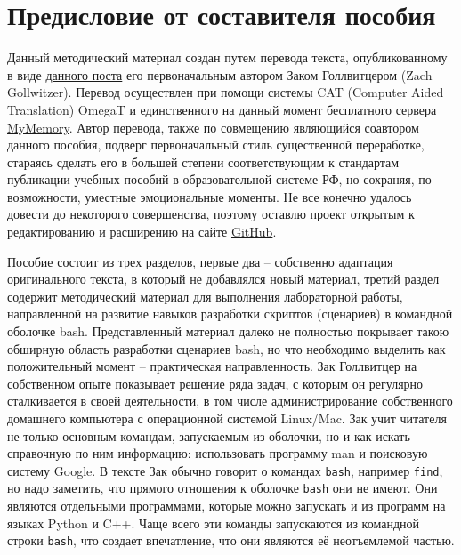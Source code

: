 \documentclass[a4paper,12pt,final,openany]{extbook}
\begin{document}
\mainmatter
\setcounter{tocdepth}{1}
\renewcommand{\contentsname}{Содержание}
\tableofcontents

\clearpage

\chapter*{Предисловие от составителя пособия}

Данный методический материал создан путем перевода текста, опубликованному в виде \href{https://zach-gollwitzer.medium.com/the-ultimate-bash-crash-course-cb598141ad03}{данного поста} его первоначальным автором Заком Голлвитцером (Zach Gollwitzer). Перевод осуществлен при помощи системы CAT (Computer Aided Translation) OmegaT и единственного на данный момент бесплатного сервера \href{https://mymemory.translated.net/}{MyMemory}. Автор перевода, также по совмещению являющийся соавтором данного пособия, подверг первоначальный стиль существенной переработке, стараясь сделать его в большей степени соответствующим к стандартам публикации учебных пособий в образовательной системе РФ, но сохраняя, по возможности, уместные эмоциональные моменты. Не все конечно удалось довести до некоторого совершенства, поэтому оставлю проект открытым к редактированию и расширению на сайте \href{https://github.com/eugeneai/bash-essentials-ru-handbok}{GitHub}. %

Пособие состоит из трех разделов, первые два -- собственно адаптация оригинального текста, в который не добавлялся новый материал, третий раздел содержит методический материал для выполнения лабораторной работы, направленной на развитие навыков разработки скриптов (сценариев) в командной оболочке bash. Представленный материал далеко не полностью покрывает такою обширную область разработки сценариев bash, но что необходимо выделить как положительный момент -- практическая направленность. Зак Голлвитцер на собственном опыте показывает решение ряда задач, с которым он регулярно сталкивается в своей деятельности, в том числе администрирование собственного домашнего компьютера с операционной системой Linux/Mac. Зак учит читателя не только основным командам, запускаемым из оболочки, но и как искать справочную по ним информацию: использовать программу man и поисковую систему Google. В тексте Зак обычно говорит о командах \texttt{bash}, например \texttt{find}, но надо заметить, что прямого отношения к оболочке \texttt{bash} они не имеют. Они являются отдельными программами, которые можно запускать и из программ на языках Python и C++.  Чаще всего эти команды запускаются из командной строки \texttt{bash}, что создает впечатление, что они являются её неотъемлемой частью.
\end{document}
